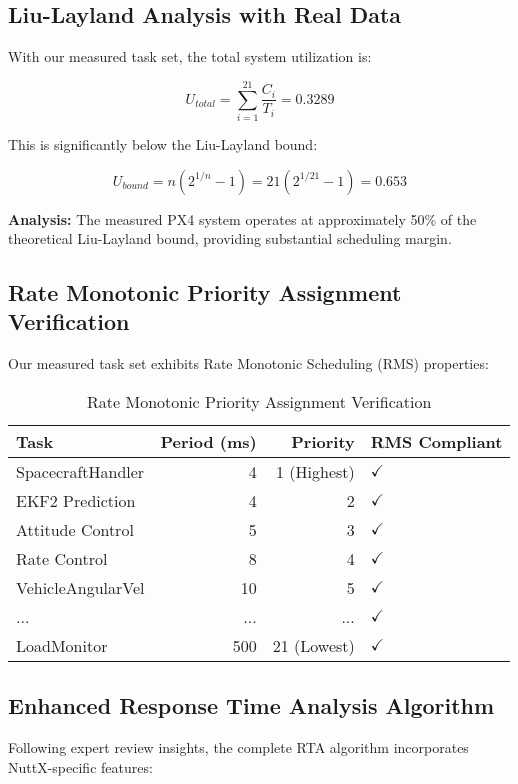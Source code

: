\documentclass[12pt,a4paper]{article}
\begin{document}
\subsection{Liu-Layland Analysis with Real Data}

With our measured task set, the total system utilization is:

$$U_{total} = \sum_{i=1}^{21} \frac{C_i}{T_i} = 0.3289$$

This is significantly below the Liu-Layland bound:

$$U_{bound} = n(2^{1/n} - 1) = 21(2^{1/21} - 1) = 0.653$$

\textbf{Analysis:} The measured PX4 system operates at approximately 50\% of the theoretical Liu-Layland bound, providing substantial scheduling margin.

\subsection{Rate Monotonic Priority Assignment Verification}

Our measured task set exhibits Rate Monotonic Scheduling (RMS) properties:

\begin{table}[H]
\centering
\begin{tabular}{|l|r|r|l|}
\hline
\textbf{Task} & \textbf{Period (ms)} & \textbf{Priority} & \textbf{RMS Compliant} \\
\hline
SpacecraftHandler & 4 & 1 (Highest) & $\checkmark$ \\
EKF2 Prediction & 4 & 2 & $\checkmark$ \\
Attitude Control & 5 & 3 & $\checkmark$ \\
Rate Control & 8 & 4 & $\checkmark$ \\
VehicleAngularVel & 10 & 5 & $\checkmark$ \\
... & ... & ... & $\checkmark$ \\
LoadMonitor & 500 & 21 (Lowest) & $\checkmark$ \\
\hline
\end{tabular}
\caption{Rate Monotonic Priority Assignment Verification}
\end{table}

\subsection{Enhanced Response Time Analysis Algorithm}

Following expert review insights, the complete RTA algorithm incorporates NuttX-specific features:
\end{document}
